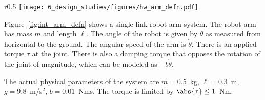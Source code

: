 


\begin{wrapfigure}{r}{0.5\textwidth}
  \texttt{[image: 6\_design\_studies/figures/hw\_arm\_defn.pdf]}\\
  \caption{Single Link Robot Arm}
  \label{fig:int_arm_defn}
\end{wrapfigure}

Figure~\ref{fig:int_arm_defn} shows a single link robot arm system.  The robot arm has mass $m$ and length $\ell$. The angle of the robot is given by $\theta$ as measured from horizontal to the ground.  The angular speed of the arm is $\dot{\theta}$.  There is an applied torque $\tau$ at the joint.  There is also a damping torque that opposes the rotation of the joint of magnitude, which can be modeled as $-b\dot{\theta}$.

The actual physical parameters of the system are $m=0.5$~kg, $\ell=0.3$~m, $g=9.8$~m/s$^2$, $b=0.01$~Nms.  The torque is limited by $\abs{\tau}\leq 1$~Nm.


